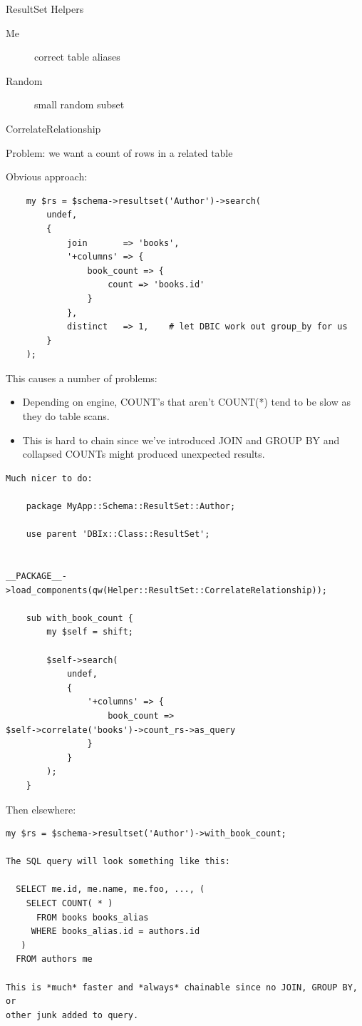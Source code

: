 \begin{frame}{ResultSet Helpers}
\begin{description}
\item[Me] correct table aliases
\item[Random] small random subset
\item[CorrelateRelationship]  
\end{description}
\end{frame}

Problem: we want a count of rows in a related table

Obvious approach:

\begin{lstlisting}
    my $rs = $schema->resultset('Author')->search(
        undef,
        {
            join       => 'books',
            '+columns' => {
                book_count => {
                    count => 'books.id'
                }
            },
            distinct   => 1,    # let DBIC work out group_by for us
        }
    );
\end{lstlisting}

This causes a number of problems:

\begin{itemize}
\item Depending on engine, COUNT’s that aren’t COUNT(*) tend to be slow as
they do table scans.
\item This is hard to chain since we've introduced JOIN and GROUP BY and
collapsed COUNTs might produced unexpected results.
\end{itemize}

\begin{lstlisting}
Much nicer to do:

    package MyApp::Schema::ResultSet::Author;

    use parent 'DBIx::Class::ResultSet';

   
__PACKAGE__->load_components(qw(Helper::ResultSet::CorrelateRelationship));

    sub with_book_count {
        my $self = shift;

        $self->search(
            undef,
            {
                '+columns' => {
                    book_count =>
$self->correlate('books')->count_rs->as_query
                }
            }
        );
    }
\end{lstlisting}

Then elsewhere:

\begin{lstlisting}
my $rs = $schema->resultset('Author')->with_book_count;

The SQL query will look something like this:

  SELECT me.id, me.name, me.foo, ..., (
    SELECT COUNT( * )
      FROM books books_alias
     WHERE books_alias.id = authors.id
   )
  FROM authors me

This is *much* faster and *always* chainable since no JOIN, GROUP BY, or
other junk added to query.
\end{lstlisting}

